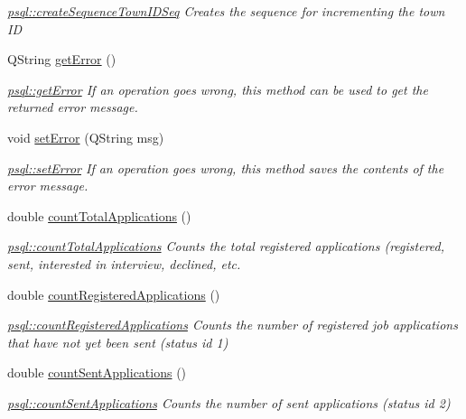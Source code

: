 \begin{DoxyCompactItemize}
\begin{DoxyCompactList}\small\item\em \mbox{\hyperlink{classpsql_a6ce21cb5a1e77cb0c280e2932d2b557d}{psql\+::create\+Sequence\+Town\+I\+D\+Seq}} Creates the sequence for incrementing the town ID \end{DoxyCompactList}\item 
Q\+String \mbox{\hyperlink{classpsql_a5f51e254b67ff932f287df2184ccc043}{get\+Error}} ()
\begin{DoxyCompactList}\small\item\em \mbox{\hyperlink{classpsql_a5f51e254b67ff932f287df2184ccc043}{psql\+::get\+Error}} If an operation goes wrong, this method can be used to get the returned error message. \end{DoxyCompactList}\item 
void \mbox{\hyperlink{classpsql_a9a0d5ba32aabe6018a36fb0bc185445b}{set\+Error}} (Q\+String msg)
\begin{DoxyCompactList}\small\item\em \mbox{\hyperlink{classpsql_a9a0d5ba32aabe6018a36fb0bc185445b}{psql\+::set\+Error}} If an operation goes wrong, this method saves the contents of the error message. \end{DoxyCompactList}\item 
double \mbox{\hyperlink{classpsql_a496d0a426a1539bf9babd1dd4e9fcd96}{count\+Total\+Applications}} ()
\begin{DoxyCompactList}\small\item\em \mbox{\hyperlink{classpsql_a496d0a426a1539bf9babd1dd4e9fcd96}{psql\+::count\+Total\+Applications}} Counts the total registered applications (registered, sent, interested in interview, declined, etc. \end{DoxyCompactList}\item 
double \mbox{\hyperlink{classpsql_a8673a80968d293cd3ead6e6e9da8dd8a}{count\+Registered\+Applications}} ()
\begin{DoxyCompactList}\small\item\em \mbox{\hyperlink{classpsql_a8673a80968d293cd3ead6e6e9da8dd8a}{psql\+::count\+Registered\+Applications}} Counts the number of registered job applications that have not yet been sent (status id 1) \end{DoxyCompactList}\item 
double \mbox{\hyperlink{classpsql_af5e6768f6c51ac7b94571505f7a628e4}{count\+Sent\+Applications}} ()
\begin{DoxyCompactList}\small\item\em \mbox{\hyperlink{classpsql_af5e6768f6c51ac7b94571505f7a628e4}{psql\+::count\+Sent\+Applications}} Counts the number of sent applications (status id 2) \end{DoxyCompactList}\item 

\end{DoxyCompactItemize}
